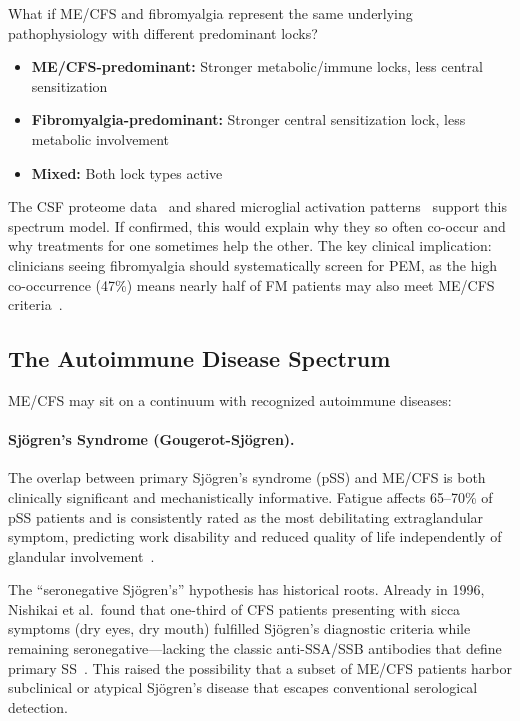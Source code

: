 \begin{open_question}
What if ME/CFS and fibromyalgia represent the same underlying pathophysiology with different predominant locks?
\begin{itemize}
    \item \textbf{ME/CFS-predominant:} Stronger metabolic/immune locks, less central sensitization
    \item \textbf{Fibromyalgia-predominant:} Stronger central sensitization lock, less metabolic involvement
    \item \textbf{Mixed:} Both lock types active
\end{itemize}
The CSF proteome data~\cite{Nilsson2023proteomics} and shared microglial activation patterns~\cite{Albrecht2019FMglial} support this spectrum model. If confirmed, this would explain why they so often co-occur and why treatments for one sometimes help the other. The key clinical implication: clinicians seeing fibromyalgia should systematically screen for PEM, as the high co-occurrence (47\%) means nearly half of FM patients may also meet ME/CFS criteria~\cite{RamirezMorales2022overlap}.
\end{open_question}

\subsection{The Autoimmune Disease Spectrum}

ME/CFS may sit on a continuum with recognized autoimmune diseases:

\paragraph{Sjögren's Syndrome (Gougerot-Sjögren).}

The overlap between primary Sjögren's syndrome (pSS) and ME/CFS is both clinically significant and mechanistically informative. Fatigue affects 65--70\% of pSS patients and is consistently rated as the most debilitating extraglandular symptom, predicting work disability and reduced quality of life independently of glandular involvement~\cite{Mardale2024SjogrenFatigue}.

The ``seronegative Sjögren's'' hypothesis has historical roots. Already in 1996, Nishikai et al.\ found that one-third of CFS patients presenting with sicca symptoms (dry eyes, dry mouth) fulfilled Sjögren's diagnostic criteria while remaining seronegative---lacking the classic anti-SSA/SSB antibodies that define primary SS~\cite{Nishikai1996seronegative}. This raised the possibility that a subset of ME/CFS patients harbor subclinical or atypical Sjögren's disease that escapes conventional serological detection.

